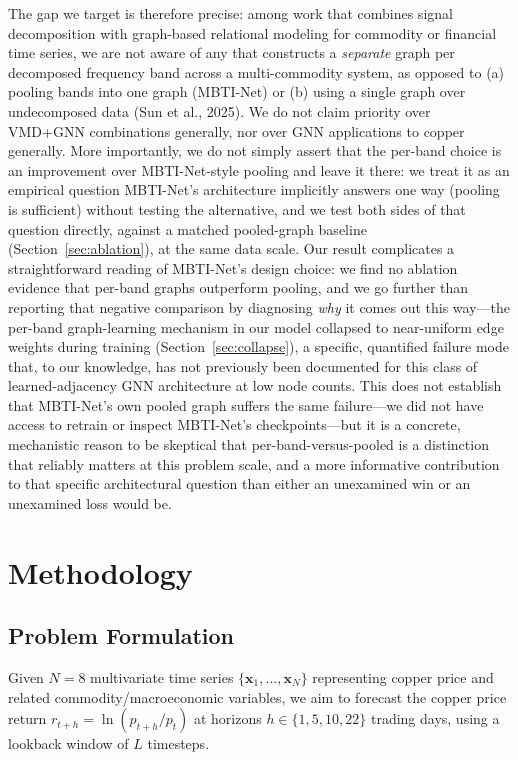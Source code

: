 \documentclass[journal]{IEEEtran}
\begin{document}
The gap we target is therefore precise: among work that combines signal decomposition with graph-based relational modeling for commodity or financial time series, we are not aware of any that constructs a \emph{separate} graph per decomposed frequency band across a multi-commodity system, as opposed to (a) pooling bands into one graph (MBTI-Net) or (b) using a single graph over undecomposed data (Sun et al., 2025). We do not claim priority over VMD+GNN combinations generally, nor over GNN applications to copper generally. More importantly, we do not simply assert that the per-band choice is an improvement over MBTI-Net-style pooling and leave it there: we treat it as an empirical question MBTI-Net's architecture implicitly answers one way (pooling is sufficient) without testing the alternative, and we test both sides of that question directly, against a matched pooled-graph baseline (Section~\ref{sec:ablation}), at the same data scale. Our result complicates a straightforward reading of MBTI-Net's design choice: we find no ablation evidence that per-band graphs outperform pooling, and we go further than reporting that negative comparison by diagnosing \emph{why} it comes out this way---the per-band graph-learning mechanism in our model collapsed to near-uniform edge weights during training (Section~\ref{sec:collapse}), a specific, quantified failure mode that, to our knowledge, has not previously been documented for this class of learned-adjacency GNN architecture at low node counts. This does not establish that MBTI-Net's own pooled graph suffers the same failure---we did not have access to retrain or inspect MBTI-Net's checkpoints---but it is a concrete, mechanistic reason to be skeptical that per-band-versus-pooled is a distinction that reliably matters at this problem scale, and a more informative contribution to that specific architectural question than either an unexamined win or an unexamined loss would be.

\section{Methodology}
\label{sec:method}

\subsection{Problem Formulation}

Given $N=8$ multivariate time series $\{\mathbf{x}_1, \ldots, \mathbf{x}_N\}$ representing copper price and related commodity/macroeconomic variables, we aim to forecast the copper price return $r_{t+h} = \ln(p_{t+h}/p_t)$ at horizons $h \in \{1, 5, 10, 22\}$ trading days, using a lookback window of $L$ timesteps.
\end{document}
